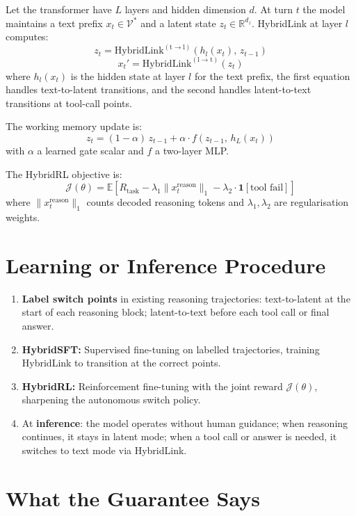 \documentclass[10pt,twocolumn]{article}
\begin{document}
Let the transformer have $L$ layers and hidden dimension $d$. At turn $t$
the model maintains a text prefix $x_t \in \mathcal{V}^*$ and a latent
state $z_t \in \mathbb{R}^{d_z}$. HybridLink at layer $l$ computes:
\[
z_t = \mathrm{HybridLink}^{(\mathrm{t}\to\mathrm{l})}\!\left(h_l(x_t),\,z_{t-1}\right)
\]
\[
x_t' = \mathrm{HybridLink}^{(\mathrm{l}\to\mathrm{t})}\!\left(z_t\right)
\]
where $h_l(x_t)$ is the hidden state at layer $l$ for the text prefix, the
first equation handles text-to-latent transitions, and the second handles
latent-to-text transitions at tool-call points.

The working memory update is:
\[
z_t = (1-\alpha)\,z_{t-1} + \alpha \cdot f\!\left(z_{t-1},\,h_L(x_t)\right)
\]
with $\alpha$ a learned gate scalar and $f$ a two-layer MLP.

The HybridRL objective is:
\[
\mathcal{J}(\theta)
= \mathbb{E}\!\left[R_{\mathrm{task}}
  - \lambda_1\|x_t^{\mathrm{reason}}\|_1
  - \lambda_2\cdot\mathbf{1}[\text{tool fail}]
\right]
\]
where $\|x_t^{\mathrm{reason}}\|_1$ counts decoded reasoning tokens and
$\lambda_1, \lambda_2$ are regularisation weights.

\section{Learning or Inference Procedure}

\begin{enumerate}[itemsep=2pt,parsep=0pt]
  \item \textbf{Label switch points} in existing reasoning trajectories:
    text-to-latent at the start of each reasoning block; latent-to-text
    before each tool call or final answer.
  \item \textbf{HybridSFT:} Supervised fine-tuning on labelled
    trajectories, training HybridLink to transition at the correct points.
  \item \textbf{HybridRL:} Reinforcement fine-tuning with the joint
    reward $\mathcal{J}(\theta)$, sharpening the autonomous switch policy.
  \item At \textbf{inference}: the model operates without human guidance;
    when reasoning continues, it stays in latent mode; when a tool call
    or answer is needed, it switches to text mode via HybridLink.
\end{enumerate}

\section{What the Guarantee Says}
\end{document}
